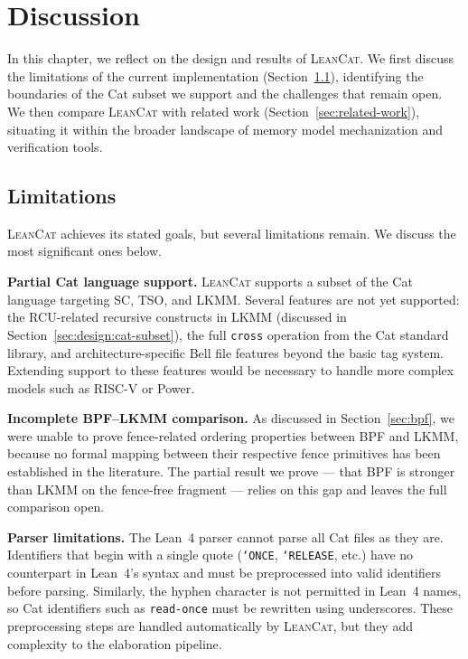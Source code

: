 \chapter{Discussion}
\label{chapter:discussion}

In this chapter, we reflect on the design and results of \textsc{LeanCat}. We first discuss the limitations of the current implementation (Section~\ref{sec:limitations}), identifying the boundaries of the Cat subset we support and the challenges that remain open. We then compare \textsc{LeanCat} with related work (Section~\ref{sec:related-work}), situating it within the broader landscape of memory model mechanization and verification tools.

\section{Limitations}
\label{sec:limitations}

\textsc{LeanCat} achieves its stated goals, but several limitations remain. We discuss the most significant ones below.

\textbf{Partial Cat language support.} \textsc{LeanCat} supports a subset of the Cat language targeting SC, TSO, and LKMM. Several features are not yet supported: the RCU-related recursive constructs in LKMM (discussed in Section~\ref{sec:design:cat-subset}), the full \texttt{cross} operation from the Cat standard library, and architecture-specific Bell file features beyond the basic tag system. Extending support to these features would be necessary to handle more complex models such as RISC-V or Power.

\textbf{Incomplete BPF--LKMM comparison.} As discussed in Section~\ref{sec:bpf}, we were unable to prove fence-related ordering properties between BPF and LKMM, because no formal mapping between their respective fence primitives has been established in the literature. The partial result we prove --- that BPF is stronger than LKMM on the fence-free fragment --- relies on this gap and leaves the full comparison open.

\textbf{Parser limitations.} The Lean~4 parser cannot parse all Cat files as they are. Identifiers that begin with a single quote (\texttt{‘ONCE}, \texttt{‘RELEASE}, etc.) have no counterpart in Lean~4’s syntax and must be preprocessed into valid identifiers before parsing. Similarly, the hyphen character is not permitted in Lean~4 names, so Cat identifiers such as \texttt{read-once} must be rewritten using underscores. These preprocessing steps are handled automatically by \textsc{LeanCat}, but they add complexity to the elaboration pipeline.

